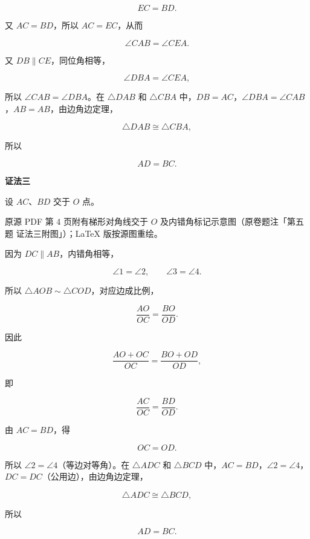 \begin{answer}
\nopagebreak[4]
\[
EC=BD.
\]

又 $AC=BD$，所以 $AC=EC$，从而

\nopagebreak[4]
\[
\angle CAB=\angle CEA.
\]

又 $DB\parallel CE$，同位角相等，

\nopagebreak[4]
\[
\angle DBA=\angle CEA,
\]

所以 $\angle CAB=\angle DBA$。在 $\triangle DAB$ 和 $\triangle CBA$ 中，$DB=AC$，$\angle DBA=\angle CAB$，$AB=AB$，由边角边定理，

\nopagebreak[4]
\[
\triangle DAB\cong\triangle CBA,
\]

所以

\nopagebreak[4]
\[
AD=BC.
\]

\textbf{证法三}

设 $AC$、$BD$ 交于 $O$ 点。

\begin{gktip}
原源 PDF 第 4 页附有梯形对角线交于 $O$ 及内错角标记示意图（原卷题注「第五题 证法三附图」）；LaTeX 版按源图重绘。
\end{gktip}
\nopagebreak[4]
\begin{center}\end{center}
\nopagebreak[4]
因为 $DC\parallel AB$，内错角相等，

\nopagebreak[4]
\[
\angle1=\angle2,\qquad
\angle3=\angle4.
\]

所以 $\triangle AOB\sim\triangle COD$，对应边成比例，

\nopagebreak[4]
\[
\frac{AO}{OC}=\frac{BO}{OD}.
\]

因此

\nopagebreak[4]
\[
\frac{AO+OC}{OC}=\frac{BO+OD}{OD},
\]

即

\nopagebreak[4]
\[
\frac{AC}{OC}=\frac{BD}{OD}.
\]

由 $AC=BD$，得

\nopagebreak[4]
\[
OC=OD.
\]

所以 $\angle2=\angle4$（等边对等角）。在 $\triangle ADC$ 和 $\triangle BCD$ 中，$AC=BD$，$\angle2=\angle4$，$DC=DC$（公用边），由边角边定理，

\nopagebreak[4]
\[
\triangle ADC\cong\triangle BCD,
\]

所以

\nopagebreak[4]
\[
AD=BC.
\]


\end{answer}
